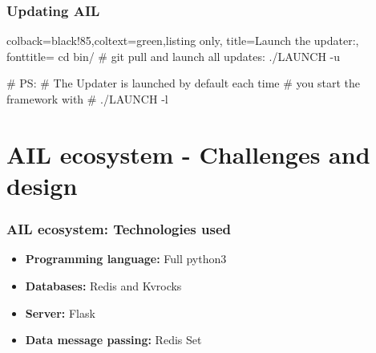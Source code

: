 \documentclass{beamer}
\begin{document}


\begin{frame}[fragile]
    \frametitle{Updating AIL}
    \begin{tcblisting}{colback=black!85,coltext=green,listing only,
        title=Launch the updater:, fonttitle=\bfseries}
cd bin/
# git pull and launch all updates:
./LAUNCH -u


# PS:
# The Updater is launched by default each time
# you start the framework with
# ./LAUNCH -l
\end{tcblisting}

\end{frame}


\section{AIL ecosystem - Challenges and design}
\begin{frame}
    \frametitle{AIL ecosystem: Technologies used}
    \begin{itemize}
        \item[] \textbf{Programming language:} Full python3
        \item[] \textbf{Databases:} Redis and Kvrocks
        \item[] \textbf{Server:} Flask
        \item[] \textbf{Data message passing:} Redis Set
    \end{itemize}
\end{frame}
\end{document}
